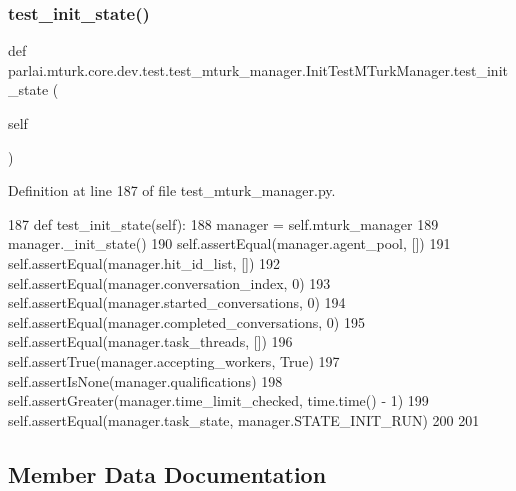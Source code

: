 \subsubsection{\texorpdfstring{test\+\_\+init\+\_\+state()}{test\_init\_state()}}
{\footnotesize\ttfamily def parlai.\+mturk.\+core.\+dev.\+test.\+test\+\_\+mturk\+\_\+manager.\+Init\+Test\+M\+Turk\+Manager.\+test\+\_\+init\+\_\+state (\begin{DoxyParamCaption}\item[{}]{self }\end{DoxyParamCaption})}



Definition at line 187 of file test\+\_\+mturk\+\_\+manager.\+py.


\begin{DoxyCode}
187     \textcolor{keyword}{def }test\_init\_state(self):
188         manager = self.mturk\_manager
189         manager.\_init\_state()
190         self.assertEqual(manager.agent\_pool, [])
191         self.assertEqual(manager.hit\_id\_list, [])
192         self.assertEqual(manager.conversation\_index, 0)
193         self.assertEqual(manager.started\_conversations, 0)
194         self.assertEqual(manager.completed\_conversations, 0)
195         self.assertEqual(manager.task\_threads, [])
196         self.assertTrue(manager.accepting\_workers, \textcolor{keyword}{True})
197         self.assertIsNone(manager.qualifications)
198         self.assertGreater(manager.time\_limit\_checked, time.time() - 1)
199         self.assertEqual(manager.task\_state, manager.STATE\_INIT\_RUN)
200 
201 
\end{DoxyCode}


\subsection{Member Data Documentation}
\mbox{\label{classparlai_1_1mturk_1_1core_1_1dev_1_1test_1_1test__mturk__manager_1_1InitTestMTurkManager_a949da6d792fcd3106aa519a941538d6b}} 
